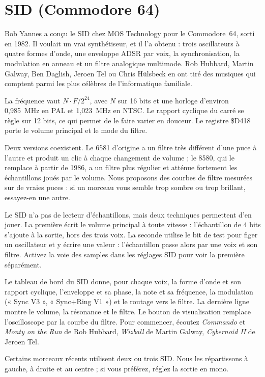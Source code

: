 \section{SID (Commodore 64)}
Bob Yannes a conçu le SID chez MOS Technology pour le Commodore~64, sorti en 1982. Il voulait un vrai synthétiseur,
et il l'a obtenu : trois oscillateurs à quatre formes d'onde, une enveloppe ADSR par voix, la synchronisation, la
modulation en anneau et un filtre analogique multimode. Rob Hubbard, Martin Galway, Ben Daglish, Jeroen Tel ou Chris
Hülsbeck en ont tiré des musiques qui comptent parmi les plus célèbres de l'informatique familiale.

La fréquence vaut $N \cdot F / 2^{24}$, avec $N$ sur 16 bits et une horloge d'environ 0,985~MHz en PAL et 1,023~MHz
en NTSC. Le rapport cyclique du carré se règle sur 12 bits, ce qui permet de le faire varier en douceur. Le registre
\$D418 porte le volume principal et le mode du filtre.

Deux versions coexistent. Le 6581 d'origine a un filtre très différent d'une puce à l'autre et produit un clic à
chaque changement de volume ; le 8580, qui le remplace à partir de 1986, a un filtre plus régulier et atténue
fortement les échantillons joués par le volume. Nous proposons des courbes de filtre mesurées sur de vraies puces :
si un morceau vous semble trop sombre ou trop brillant, essayez-en une autre.

Le SID n'a pas de lecteur d'échantillons, mais deux techniques permettent d'en jouer. La première écrit le volume
principal à toute vitesse : l'échantillon de 4 bits s'ajoute à la sortie, hors des trois voix. La seconde utilise le
bit de test pour figer un oscillateur et y écrire une valeur : l'échantillon passe alors par une voix et son filtre.
Activez la voie des samples dans les réglages SID pour voir la première séparément.

Le tableau de bord du SID donne, pour chaque voix, la forme d'onde et son rapport cyclique, l'enveloppe et sa phase,
la note et sa fréquence, la modulation (« Sync V3 », « Sync+Ring V1 ») et le routage vers le filtre. La dernière
ligne montre le volume, la résonance et le filtre. Le bouton de visualisation remplace l'oscilloscope par la courbe
du filtre. Pour commencer, écoutez \emph{Commando} et \emph{Monty on the Run} de Rob Hubbard, \emph{Wizball} de
Martin Galway, \emph{Cybernoid II} de Jeroen Tel.

Certains morceaux récents utilisent deux ou trois SID. Nous les répartissons à gauche, à droite et au centre ; si
vous préférez, réglez la sortie en mono.

